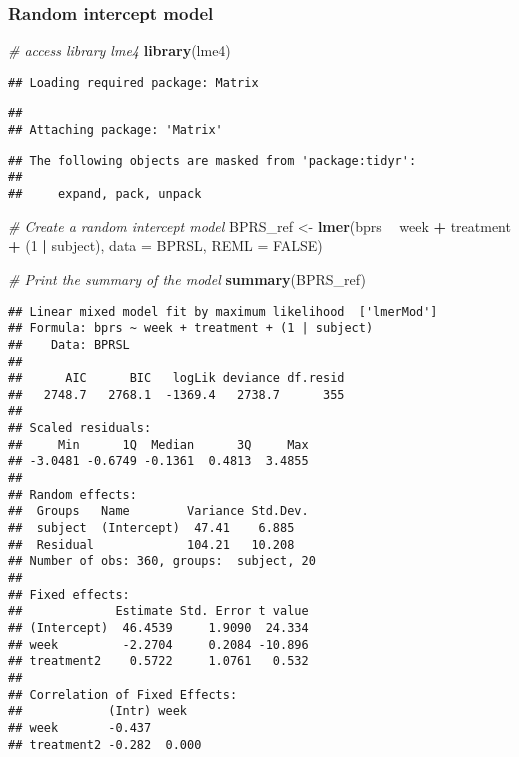 \documentclass[]{article}
\newenvironment{Shaded}{\begin{snugshade}}{\end{snugshade}}
\newcommand{\KeywordTok}[1]{\textcolor[rgb]{0.13,0.29,0.53}{\textbf{#1}}}
\newcommand{\DataTypeTok}[1]{\textcolor[rgb]{0.13,0.29,0.53}{#1}}
\newcommand{\DecValTok}[1]{\textcolor[rgb]{0.00,0.00,0.81}{#1}}
\newcommand{\StringTok}[1]{\textcolor[rgb]{0.31,0.60,0.02}{#1}}
\newcommand{\CommentTok}[1]{\textcolor[rgb]{0.56,0.35,0.01}{\textit{#1}}}
\newcommand{\OtherTok}[1]{\textcolor[rgb]{0.56,0.35,0.01}{#1}}
\newcommand{\OperatorTok}[1]{\textcolor[rgb]{0.81,0.36,0.00}{\textbf{#1}}}
\newcommand{\NormalTok}[1]{#1}
\begin{document}
\subsubsection{Random intercept model}\label{random-intercept-model}

\begin{Shaded}
\begin{Highlighting}[]
\CommentTok{# access library lme4}
\KeywordTok{library}\NormalTok{(lme4)}
\end{Highlighting}
\end{Shaded}

\begin{verbatim}
## Loading required package: Matrix
\end{verbatim}

\begin{verbatim}
## 
## Attaching package: 'Matrix'
\end{verbatim}

\begin{verbatim}
## The following objects are masked from 'package:tidyr':
## 
##     expand, pack, unpack
\end{verbatim}

\begin{Shaded}
\begin{Highlighting}[]
\CommentTok{# Create a random intercept model}
\NormalTok{BPRS_ref <-}\StringTok{ }\KeywordTok{lmer}\NormalTok{(bprs }\OperatorTok{~}\StringTok{ }\NormalTok{week }\OperatorTok{+}\StringTok{ }\NormalTok{treatment }\OperatorTok{+}\StringTok{ }\NormalTok{(}\DecValTok{1} \OperatorTok{|}\StringTok{ }\NormalTok{subject), }\DataTypeTok{data =}\NormalTok{ BPRSL, }\DataTypeTok{REML =} \OtherTok{FALSE}\NormalTok{)}

\CommentTok{# Print the summary of the model}
\KeywordTok{summary}\NormalTok{(BPRS_ref)}
\end{Highlighting}
\end{Shaded}

\begin{verbatim}
## Linear mixed model fit by maximum likelihood  ['lmerMod']
## Formula: bprs ~ week + treatment + (1 | subject)
##    Data: BPRSL
## 
##      AIC      BIC   logLik deviance df.resid 
##   2748.7   2768.1  -1369.4   2738.7      355 
## 
## Scaled residuals: 
##     Min      1Q  Median      3Q     Max 
## -3.0481 -0.6749 -0.1361  0.4813  3.4855 
## 
## Random effects:
##  Groups   Name        Variance Std.Dev.
##  subject  (Intercept)  47.41    6.885  
##  Residual             104.21   10.208  
## Number of obs: 360, groups:  subject, 20
## 
## Fixed effects:
##             Estimate Std. Error t value
## (Intercept)  46.4539     1.9090  24.334
## week         -2.2704     0.2084 -10.896
## treatment2    0.5722     1.0761   0.532
## 
## Correlation of Fixed Effects:
##            (Intr) week  
## week       -0.437       
## treatment2 -0.282  0.000
\end{verbatim}
\end{document}
